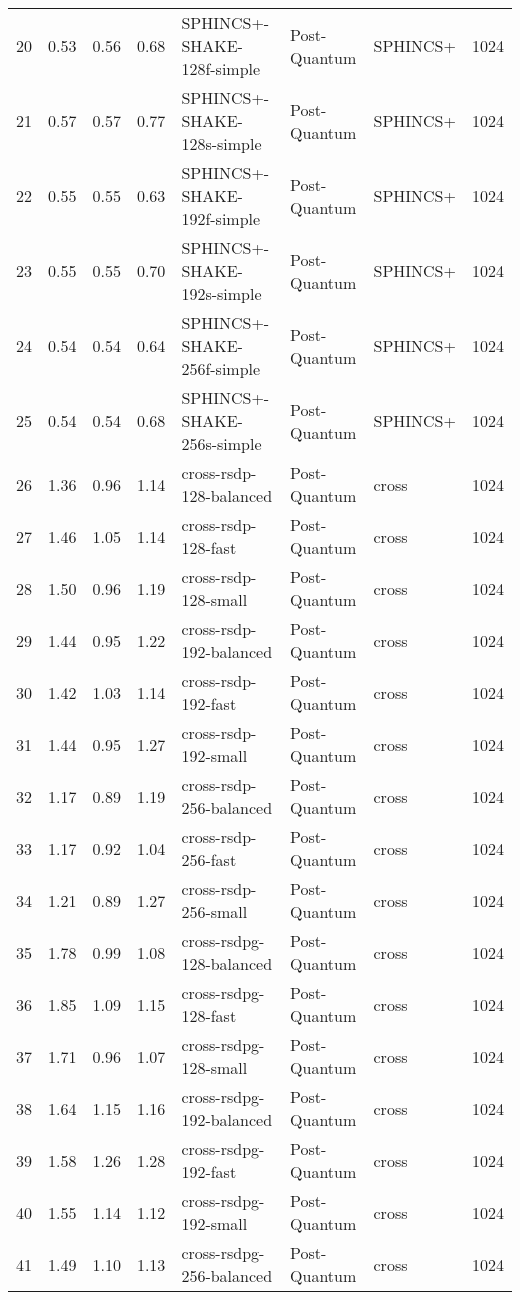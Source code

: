 \begin{table}
\begin{tabular}{lrrrlllr}
20 & 0.53 & 0.56 & 0.68 & SPHINCS+-SHAKE-128f-simple & Post-Quantum & SPHINCS+ & 1024 \\
21 & 0.57 & 0.57 & 0.77 & SPHINCS+-SHAKE-128s-simple & Post-Quantum & SPHINCS+ & 1024 \\
22 & 0.55 & 0.55 & 0.63 & SPHINCS+-SHAKE-192f-simple & Post-Quantum & SPHINCS+ & 1024 \\
23 & 0.55 & 0.55 & 0.70 & SPHINCS+-SHAKE-192s-simple & Post-Quantum & SPHINCS+ & 1024 \\
24 & 0.54 & 0.54 & 0.64 & SPHINCS+-SHAKE-256f-simple & Post-Quantum & SPHINCS+ & 1024 \\
25 & 0.54 & 0.54 & 0.68 & SPHINCS+-SHAKE-256s-simple & Post-Quantum & SPHINCS+ & 1024 \\
26 & 1.36 & 0.96 & 1.14 & cross-rsdp-128-balanced & Post-Quantum & cross & 1024 \\
27 & 1.46 & 1.05 & 1.14 & cross-rsdp-128-fast & Post-Quantum & cross & 1024 \\
28 & 1.50 & 0.96 & 1.19 & cross-rsdp-128-small & Post-Quantum & cross & 1024 \\
29 & 1.44 & 0.95 & 1.22 & cross-rsdp-192-balanced & Post-Quantum & cross & 1024 \\
30 & 1.42 & 1.03 & 1.14 & cross-rsdp-192-fast & Post-Quantum & cross & 1024 \\
31 & 1.44 & 0.95 & 1.27 & cross-rsdp-192-small & Post-Quantum & cross & 1024 \\
32 & 1.17 & 0.89 & 1.19 & cross-rsdp-256-balanced & Post-Quantum & cross & 1024 \\
33 & 1.17 & 0.92 & 1.04 & cross-rsdp-256-fast & Post-Quantum & cross & 1024 \\
34 & 1.21 & 0.89 & 1.27 & cross-rsdp-256-small & Post-Quantum & cross & 1024 \\
35 & 1.78 & 0.99 & 1.08 & cross-rsdpg-128-balanced & Post-Quantum & cross & 1024 \\
36 & 1.85 & 1.09 & 1.15 & cross-rsdpg-128-fast & Post-Quantum & cross & 1024 \\
37 & 1.71 & 0.96 & 1.07 & cross-rsdpg-128-small & Post-Quantum & cross & 1024 \\
38 & 1.64 & 1.15 & 1.16 & cross-rsdpg-192-balanced & Post-Quantum & cross & 1024 \\
39 & 1.58 & 1.26 & 1.28 & cross-rsdpg-192-fast & Post-Quantum & cross & 1024 \\
40 & 1.55 & 1.14 & 1.12 & cross-rsdpg-192-small & Post-Quantum & cross & 1024 \\
41 & 1.49 & 1.10 & 1.13 & cross-rsdpg-256-balanced & Post-Quantum & cross & 1024 \\

\end{tabular}
\end{table}
